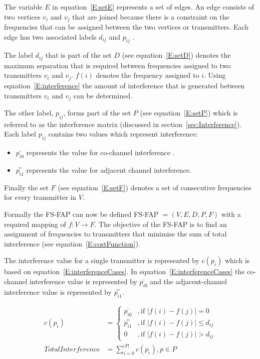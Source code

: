 The variable $E$ in equation~\ref{E:setE} represents a set of edges\cite{MontemanniThesis}. An edge consists of two vertices $v_i$ and $v_j$ that are joined because there is a constraint on the frequencies that can be assigned between the two vertices or transmitter\cite{MontemanniThesis}s. Each edge has two associated labels $d_{ij}$ and $p_{ij}$ \cite{FAPOrientationModel,TabuMontemanniSmith}. 

The label $d_{ij}$ that is part of the set $D$ (see equation~\ref{E:setD}) denotes the maximum separation that is required between frequencies assigned to two transmitters $v_i$ and $v_j$. $f(i)$ denotes the frequency assigned to $i$. Using equation~\ref{E:interference} the amount of interference that is generated between transmitters $v_i$ and $v_j$ can be determined\cite{FAPOrientationModel,TabuMontemanniSmith}.

The other label, $p_{ij}$, forms part of the set $P$ (see equation~\ref{E:setP}) which is referred to as the interference matrix (discussed in section~\ref{sec:Interference})\cite{Eisenblatter}. Each label $p_{ij}$ contains two values which represent interference:
\begin{itemize}
\item $\bar{p_{i0}}$ represents the value for co-channel interference \cite{FAPOrientationModel,TabuMontemanniSmith}. 
\item $\overset{=}{p_{i1}}$ represents the value for adjacent channel interference\cite{FAPOrientationModel,TabuMontemanniSmith}.
\end{itemize}

Finally the set $F$ (see equation~\ref{E:setF}) denotes a set of consecutive frequencies for every transmitter in $V$\cite{FAPOrientationModel,TabuMontemanniSmith}.

Formally the \gls{FS-FAP} can now be defined \gls{FS-FAP} $= (V,E,D,P,F)$ with a required mapping of $f: V \rightarrow F$\cite{TabuMontemanniSmith}. The objective of the \gls{FS-FAP} is to find an assignment of frequencies to transmitters that minimise the sum of total interference (see equation~\ref{E:costFunction}). 

The interference value for a single transmitter is represented by $c(p_i)$ which is based on equation~\ref{E:interferenceCases}. In equation~\ref{E:interferenceCases} the co-channel interference value is represented by $\bar{p_{i0}}$ and the adjacent-channel interference value is represented by $\overset{=}{p_{i1}}$.

\begin{align} 
 \label{E:interferenceCases}
 c(p_i) &= 
 \begin{cases}
	\bar{p_{i0}} &,\text{if $|f(i) - f(j)| = 0$}\\
	\overset{=}{p_{i1}} &, \text{if $|f(i) - f(j)| \leqslant d_{ij}$}\\
	0 &,\text{if $|f(i) - f(j)| > d_{ij}$}
 \end{cases}\\
 \label{E:costFunction}
 Total Interference &= \sum^{|P|}_{i = 0}c(p_i),p \in P 
\end{align}

